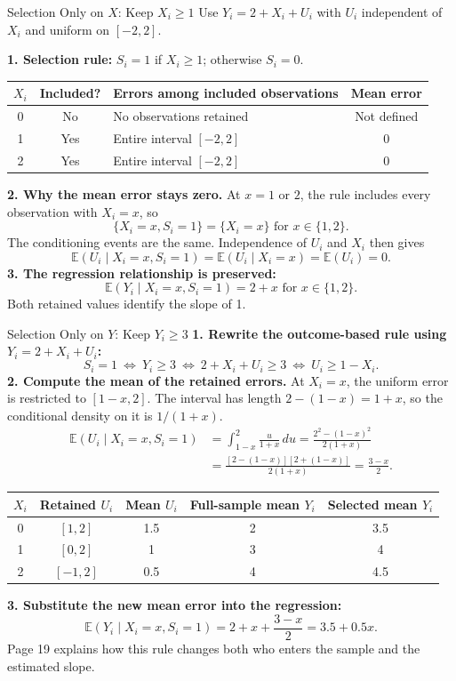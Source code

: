 \documentclass[notes,10pt, aspectratio=169]{beamer}
\begin{document}
\begin{frame}{Selection Only on $X$: Keep $X_i\geq1$}
\small
Use $Y_i=2+X_i+U_i$ with $U_i$ independent of $X_i$ and uniform on $[-2,2]$.
\medskip

\textbf{1. Selection rule:} $S_i=1$ if $X_i\geq1$; otherwise $S_i=0$.
\begin{center}
\begin{tabular}{cclc}
\hline
$X_i$ & Included? & Errors among included observations & Mean error\\
\hline
0 & No & No observations retained & Not defined\\
1 & Yes & Entire interval $[-2,2]$ & 0\\
2 & Yes & Entire interval $[-2,2]$ & 0\\
\hline
\end{tabular}
\end{center}
\textbf{2. Why the mean error stays zero.}
At $x=1$ or $2$, the rule includes every observation with $X_i=x$, so
\[
\{X_i=x, S_i=1\}=\{X_i=x\}\text{ for }x\in\{1,2\}.
\]
The conditioning events are the same. Independence of $U_i$ and $X_i$ then gives
\[
\mathbb{E}(U_i\mid X_i=x,S_i=1)
=\mathbb{E}(U_i\mid X_i=x)=\mathbb{E}(U_i)=0.
\]
\textbf{3. The regression relationship is preserved:}
\[
\mathbb{E}(Y_i\mid X_i=x,S_i=1)=2+x\text{ for }x\in\{1,2\}.
\]
Both retained values identify the slope of 1.
\end{frame}

\begin{frame}{Selection Only on $Y$: Keep $Y_i\geq3$}
\small
\setlength{\abovedisplayskip}{3pt}
\setlength{\belowdisplayskip}{3pt}
\textbf{1. Rewrite the outcome-based rule using $Y_i=2+X_i+U_i$:}
\[
S_i=1\ \Longleftrightarrow\ Y_i\geq3
\ \Longleftrightarrow\ 2+X_i+U_i\geq3
\ \Longleftrightarrow\ \boxed{U_i\geq1-X_i.}
\]
\textbf{2. Compute the mean of the retained errors.}
At $X_i=x$, the uniform error is restricted to $[1-x,2]$.
The interval has length $2-(1-x)=1+x$, so the conditional density on it is $1/(1+x)$.
\[
\begin{aligned}
\mathbb{E}(U_i\mid X_i=x,S_i=1)
&=\int_{1-x}^{2}\frac{u}{1+x}\,du
=\frac{2^2-(1-x)^2}{2(1+x)}\\
&=\frac{[2-(1-x)][2+(1-x)]}{2(1+x)}
=\frac{3-x}{2}.
\end{aligned}
\]
\begin{center}
\begin{tabular}{ccccc}
\hline
$X_i$ & Retained $U_i$ & Mean $U_i$ & Full-sample mean $Y_i$ & Selected mean $Y_i$\\
\hline
0 & $[1,2]$ & 1.5 & 2 & 3.5\\
1 & $[0,2]$ & 1 & 3 & 4\\
2 & $[-1,2]$ & 0.5 & 4 & 4.5\\
\hline
\end{tabular}
\end{center}
\textbf{3. Substitute the new mean error into the regression:}
\[
\mathbb{E}(Y_i\mid X_i=x,S_i=1)
=2+x+\frac{3-x}{2}=\boxed{3.5+0.5x}.
\]
Page 19 explains how this rule changes both who enters the sample and the estimated slope.
\end{frame}
\end{document}
